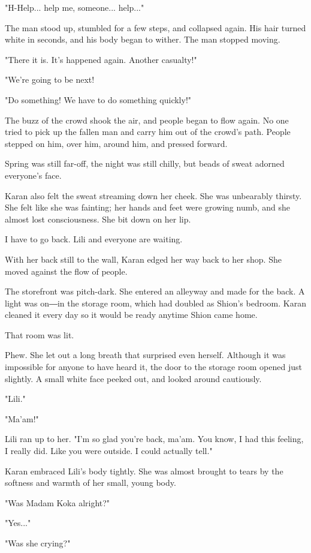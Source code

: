 "H-Help... help me, someone... help..."

The man stood up, stumbled for a few steps, and collapsed again. His
hair turned white in seconds, and his body began to wither. The man
stopped moving.

"There it is. It's happened again. Another casualty!"

"We're going to be next!

"Do something! We have to do something quickly!"

The buzz of the crowd shook the air, and people began to flow again. No
one tried to pick up the fallen man and carry him out of the crowd's
path. People stepped on him, over him, around him, and pressed forward.

Spring was still far-off, the night was still chilly, but beads of sweat
adorned everyone's face.

Karan also felt the sweat streaming down her cheek. She was unbearably
thirsty. She felt like she was fainting; her hands and feet were growing
numb, and she almost lost consciousness. She bit down on her lip.

I have to go back. Lili and everyone are waiting.

With her back still to the wall, Karan edged her way back to her shop.
She moved against the flow of people.

The storefront was pitch-dark. She entered an alleyway and made for the
back. A light was on―in the storage room, which had doubled as Shion's
bedroom. Karan cleaned it every day so it would be ready anytime Shion
came home.

That room was lit.

Phew. She let out a long breath that surprised even herself. Although it
was impossible for anyone to have heard it, the door to the storage room
opened just slightly. A small white face peeked out, and looked around
cautiously.

"Lili."

"Ma'am!"

Lili ran up to her. "I'm so glad you're back, ma'am. You know, I had
this feeling, I really did. Like you were outside. I could actually
tell."

Karan embraced Lili's body tightly. She was almost brought to tears by
the softness and warmth of her small, young body.

"Was Madam Koka alright?"

"Yes..."

"Was she crying?"


